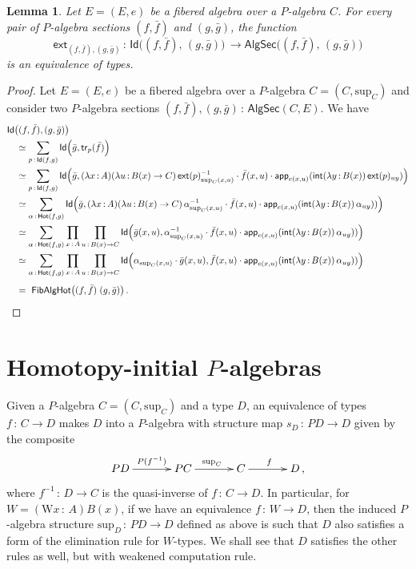 \documentclass[10pt,a4paper,oneside,reqno]{amsart}
\theoremstyle{mythm}
\newtheorem{lemma}[theorem]{Lemma}
\theoremstyle{mydef}
\theoremstyle{myrmk}
\newcommand{\co}{\,{:}\,}
\newcommand{\ct}{\cdot}
\newcommand{\trans}{\mathsf{tr}}
\newcommand{\Hot}{\mathsf{Hot}}
\newcommand{\ext}{\mathsf{ext}}
\renewcommand{\int}{\mathsf{int}}
\newcommand{\Id}{\mathsf{Id}}
\newcommand{\app}{\mathsf{app}}
\newcommand{\W}{\mathrm{W}}
\renewcommand{\sup}{\mathrm{sup}}
\newcommand{\FibAlgHot}{\mathsf{FibAlgHot}}
\newcommand{\PalgSec}{\mathsf{AlgSec}}
\newcommand{\AlgSecHot}{\mathsf{AlgSec}}
\begin{document}
\begin{lemma}\label{lem:fibhomeqid} Let $E = (E, e)$ be a fibered algebra over a $P$-algebra $C$.
For every pair of $P$-algebra sections $(f, \bar{f})$ and $(g, \bar{g})$,  the function
\[
\ext_{(f, \bar{f}), (g, \bar{g})} \co \Id \big( (f, \bar{f}) ,\, (g, \bar{g}) \big) \, \to
\AlgSecHot\big( (f, \bar{f}) ,\, (g, \bar{g}) \big) 
\]
is an equivalence of types.
\end{lemma}

\begin{proof}Let $E = (E, e)$ be a fibered algebra over a $P$-algebra $C = (C, \sup_C)$ and consider two $P$-algebra
sections $(f,\bar{f}), (g,\bar{g}) \co \PalgSec(C,E)$. We have
\begin{align*}
 & \Id\big( (f,\bar{f}),  (g,\bar{g}) \big) \\ 
& \quad \simeq \sum_{p \co \Id( f , g)} \Id \Big(\bar{g} , \trans_p ( \bar{f} ) \Big)  \\
& \quad \simeq \sum_{p \co \Id( f , g)} \Id \Big(\bar{g}, 
(\lambda x \co A)(\lambda u \co B(x) \to C) \, \ext(p)_{\sup_C(x,u)}^{-1} \ct \bar{f}(x,u) \ct
 \app_{e(x,u)}(\int (\lambda y 
\co B(x) ) \, \ext(p)_{u  y})  \Big)  \\
& \quad \simeq \sum_{\alpha \co \Hot( f, g)} \Id \Big(\bar{g},  (\lambda x \co A) (\lambda u \co B(x) \to C) \, \alpha_{\sup_C(x,u)}^{-1} \ct \bar{f}(x,u) \ct 
\app_{e(x,u)} (\int (\lambda y \co B(x))  \,  \alpha_{u y}))  \Big)  \\
&\quad \simeq \sum_{\alpha \co \Hot( f, g)} \prod_{x \co A}\prod_{u \co B(x) \to C } \Id \Big(\bar{g}(x,u) , \alpha_{\sup_C(x,u)}^{-1} \ct \bar{f}(x,u) \ct \app_{e(x,u)}(\int (\lambda y \co B(x)) \, \alpha_{u  y})) \Big)  \\ 
& \quad \simeq \sum_{\alpha \co \Hot( f, g)} \prod_{x \co A}\prod_{u \co B(x) \to C } \Id \Big(\alpha_{\sup_C(x,u)} \ct \bar{g}(x,u) , \bar{f}(x,u) \ct 
\app_{e(x,u)}(\int  (\lambda y \co B(x)) \,  \alpha_{u  y})) \Big) \\[1ex]
& \quad = \  \FibAlgHot \big( (f,\bar{f}) \; (g,\bar{g}) \big) \, . \qedhere
\end{align*}  
\end{proof}


 

\section{Homotopy-initial $P$-algebras}

Given a $P$-algebra $C = (C, \sup_C)$ and a type $D$, an equivalence of types $f \co C \to D$ makes $D$ into a $P$-algebra with structure map $s_D \co PD \to D$ given by the composite
\[
\xymatrix@C=1.2cm{
PD \ar[r]^{P(f^{-1})} & PC \ar[r]^{\sup_C} & C \ar[r]^f & D \, , }
\]
 where $f^{-1} \co D \to C$ is the quasi-inverse of $f \co C \to D$. In particular, for $W = (\W x \co A) B(x)$, if we have an equivalence  
 $f \co W \to D$, then the induced $P$-algebra structure $\sup_D \co PD \to D$ defined as above is such that $D$ also satisfies 
 a form of the elimination rule for $W$-types.  We shall see that $D$ satisfies the other rules as well, but with weakened computation rule.
\end{document}
